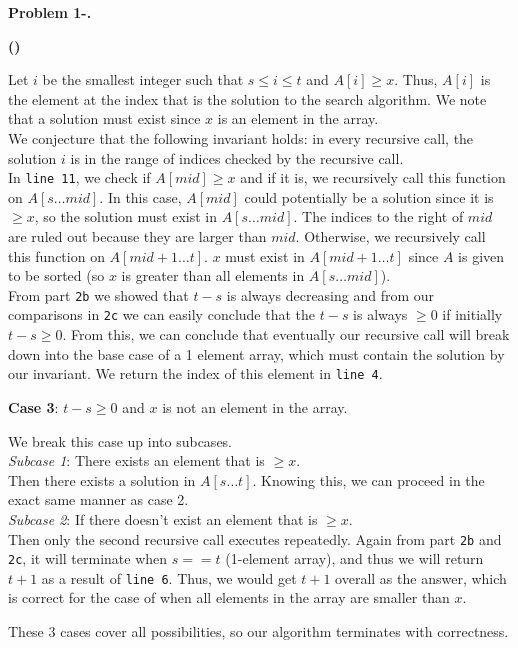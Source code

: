 \documentclass[12pt,twoside]{article}
\newcommand{\points}[1]{[#1 points]\ }
\newcounter{problemnum}
\newcommand{\theproblem}{Problem \theproblemsetnum-\arabic{problemnum}}
\newenvironment{problems}{
        \begin{list}{{\bf \theproblem. \hspace*{0.5em}}}
        {\setlength{\leftmargin}{0em}
         \setlength{\rightmargin}{0em}
         \setlength{\labelwidth}{0em}
         \setlength{\labelsep}{0em}
         \usecounter{problemnum}}}{\end{list}}
\newcounter{problempartnum}[problemnum]
\newenvironment{problemparts}{
        \begin{list}{{\bf (\alph{problempartnum})}}
        {\setlength{\leftmargin}{2.5em}
         \setlength{\rightmargin}{2.5em}
         \setlength{\labelsep}{0.5em}}}{\end{list}}
\newcommand{\problempart}{\addtocounter{problempartnum}{1}\item}
\newcommand{\theproblemsetnum}{1}
\begin{document}
\begin{problems}
\begin{problemparts}
{{Let $i$ be the smallest integer such that $s \leq i \leq t$ and $A[i]\geq x$. Thus, $A[i]$ is the element at the index that is the solution to the search algorithm. We note that a solution must exist since $x$ is an element in the array.\\
We conjecture that the following invariant holds: in every recursive call, the solution $i$ is in the range of indices checked by the recursive call.\\
In \texttt{line 11}, we check if $A[mid]\geq x$ and if it is, we recursively call this function on $A[s \dots mid]$. In this case, $A[mid]$ could potentially be a solution since it is $\geq x$, so the solution must exist in $A[s \dots mid]$. The indices to the right of $mid$ are ruled out because they are larger than $mid$. Otherwise, we recursively call this function on $A[mid + 1 \dots t]$. $x$ must exist in $A[mid + 1 \dots t]$ since $A$ is given to be sorted (so $x$ is greater than all elements in $A[s \dots mid]$).\\
From part \texttt{2b} we showed that $t - s$ is always decreasing and from our comparisons in \texttt{2c} we can easily conclude that the $t - s$ is always $\geq 0$ if initially $t - s \geq 0$. From this, we can conclude that eventually our recursive call will break down into the base case of a 1 element array, which must contain the solution by our invariant. We return the index of this element in \texttt{line 4}.

\textbf{Case 3}: $t - s \geq 0$ and $x$ is not an element in the array.

We break this case up into subcases.\\
\emph{Subcase 1}: There exists an element that is $\geq x$.\\
Then there exists a solution in $A[s \dots t]$. Knowing this, we can proceed in the exact same manner as case 2. \\
\emph{Subcase 2}: If there doesn't exist an element that is $\geq x$.\\
Then only the second recursive call executes repeatedly. Again from part \texttt{2b} and \texttt{2c}, it will terminate when $s == t$ (1-element array), and thus we will return $t + 1$ as a result of \texttt{line 6}. Thus, we would get $t+1$ overall as the answer, which is correct for the case of when all elements in the array are smaller than $x$.

These 3 cases cover all possibilities, so our algorithm terminates with correctness.
}}


\problempart \points{5}


\end{problemparts}
\end{problems}
\end{document}
